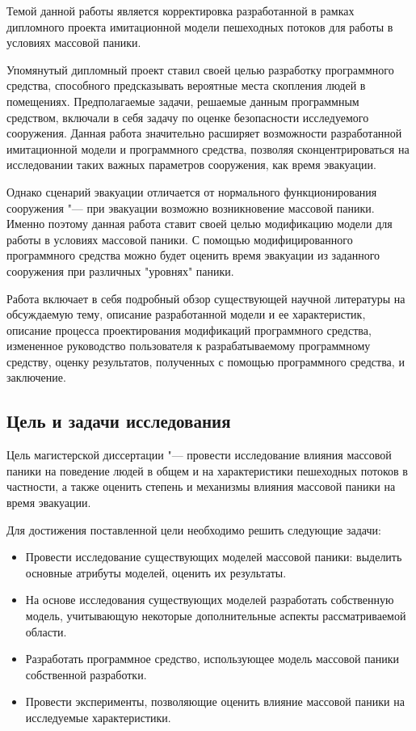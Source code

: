 
Темой данной работы является корректировка разработанной в рамках дипломного проекта имитационной модели пешеходных потоков для работы в условиях массовой паники.

Упомянутый дипломный проект ставил своей целью разработку программного средства, способного предсказывать вероятные места скопления людей в помещениях.
Предполагаемые задачи, решаемые данным программным средством, включали в себя задачу по оценке безопасности исследуемого сооружения.
Данная работа значительно расширяет возможности разработанной имитационной модели и программного средства, позволяя сконцентрироваться на исследовании таких важных параметров сооружения, как время эвакуации.

Однако сценарий эвакуации отличается от нормального функционирования сооружения "--- при эвакуации возможно возникновение массовой паники.
Именно поэтому данная работа ставит своей целью модификацию модели для работы в условиях массовой паники.
С помощью модифицированного программного средства можно будет оценить время эвакуации из заданного сооружения при различных "уровнях" паники.

Работа включает в себя подробный обзор существующей научной литературы на обсуждаемую тему, описание разработанной модели и ее характеристик,
описание процесса проектирования модификаций программного средства, измененное руководство пользователя к разрабатываемому программному средству, оценку результатов, полученных с помощью программного средства,
и заключение.


\label{sec:general_characteristics}

\subsection*{\textbf{Цель и задачи исследования}}

Цель магистерской диссертации "--- провести исследование влияния массовой паники на поведение людей в общем
и на характеристики пешеходных потоков в частности, а также оценить степень и механизмы влияния массовой паники
на время эвакуации.

Для достижения поставленной цели необходимо решить следующие задачи:

\begin{itemize}
  \item Провести исследование существующих моделей массовой паники: выделить основные атрибуты моделей, оценить их результаты.
  \item На основе исследования существующих моделей разработать собственную модель, учитывающую некоторые дополнительные аспекты рассматриваемой области.
  \item Разработать программное средство, использующее модель массовой паники собственной разработки.
  \item Провести эксперименты, позволяющие оценить влияние массовой паники на исследуемые характеристики.
\end{itemize}

